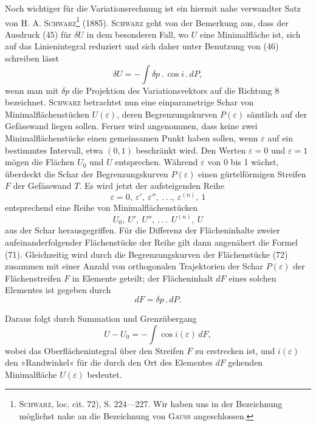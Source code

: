 Noch wichtiger für die Variationsrechnung ist ein hiermit nahe verwandter
Satz von H. A. \textsc{Schwarz}\footnote{\textsc{Schwarz}, loc. cit. 72), S. 224—227. Wir haben uns in der Bezeichnung möglichst nahe an die
Bezeichnung von \textsc{Gauss} angeschlossen.} (1885). \textsc{Schwarz} geht von der Bemerkung
aus, dass der Ausdruck (45) für $\delta U$ in dem besonderen Fall, wo $U$ eine Minimalfläche
ist, sich auf das Linienintegral reduziert und sich daher unter Benutzung
von (46) schreiben lässt
\begin{equation*}\tag{71}
\delta U=-\int\delta p\mathpunct{.}\cos i\mathpunct{.}dP,
\end{equation*}
wenn man mit $\delta p$ die Projektion des Variationsvektors auf die Richtung 8 bezeichnet.
\textsc{Schwarz} betrachtet nun eine einparametrige Schar von Minimalflächenstücken
$U(\varepsilon)$, deren Begrenzungskurven $P(\varepsilon)$ sämtlich auf der Gefässwand
liegen sollen. Ferner wird angenommen, dass keine zwei Minimalflächenstücke
einen gemeinsamen Punkt haben sollen, wenn $\varepsilon$ auf ein bestimmtes
Intervall, etwa $(0,1)$ beschränkt wird. Den Werten $\varepsilon=0$ und $\varepsilon=1$ mögen
die Flächen $U_0$ und $U$ entsprechen. Während $\varepsilon$ von 0 bis 1 wächst, überdeckt
die Schar der Begrenzungskurven $P(\varepsilon)$ einen gürtelförmigen Streifen $F$
der Gefässwand $T$. Es wird jetzt der aufsteigenden Reihe
\[
\varepsilon=0,\ \varepsilon',\ \varepsilon'',\ .\, .\, .,\ \varepsilon^{(n)},\ 1
\]
entsprechend eine Reihe von Minimalflächenstücken
\clearpage{}
\begin{equation*}\tag{72}
U_0,\ U',\ U'',\ .\, .\, .\ \ U^{(n)},\ U
\end{equation*}
aus der Schar herausgegriffen. Für die Differenz der Flächeninhalte zweier
aufeinanderfolgender Flächenstücke der Reihe gilt dann angenähert die Formel
(71). Gleichzeitig wird durch die Begrenzungskurven der Flächenstücke
(72) zusammen mit einer Anzahl von orthogonalen Trajektorien der Schar
$P(\varepsilon)$ der Flächenstreifen $F$ in Elemente geteilt; der Flächeninhalt $dF$ eines
solchen Elementes ist gegeben durch
\[
dF=\delta p\mathpunct{.}dP.
\]

Daraus folgt durch Summation und Grenzübergang
\begin{equation*}\tag{73}
U-U_0=-\int\cos i(\varepsilon)\,dF,
\end{equation*}
wobei das Oberflächenintegral über den Streifen $F$ zu erstrecken ist, und $i(\varepsilon)$
den »Randwinkel« für die durch den Ort des Elementes $dF$ gehenden Minimalfläche
$U(\varepsilon)$ bedeutet.

